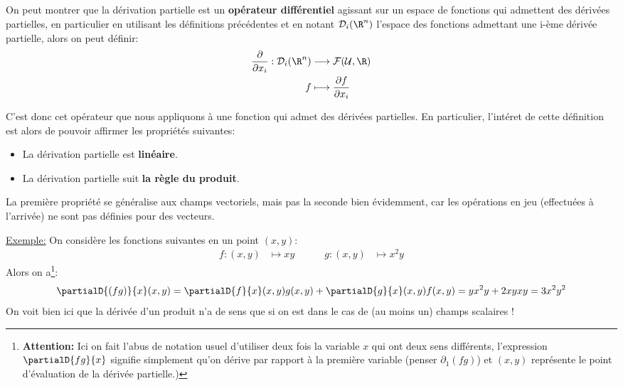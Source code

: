 \subsection*{}
On peut montrer que la dérivation partielle est un \textbf{opérateur différentiel} agissant sur un espace de fonctions qui admettent des dérivées partielles, en particulier en utilisant les définitions précédentes et en notant \(\mathcal{D}_i(\R^n)\) l'espace des fonctions admettant une i-ème dérivée partielle, alors on peut définir:
\[
   \begin{aligned}
      \frac{\partial}{\partial x_i} : \mathcal{D}_i(\R^n) &\longrightarrow \mathcal{F}(\mathcal{U}, \R)\\
      f &\longmapsto \frac{\partial f}{\partial x_i}
   \end{aligned}
\]

C'est donc cet opérateur que nous appliquons à une fonction qui admet des dérivées partielles. En particulier, l'intéret de cette définition est alors de pouvoir affirmer les propriétés suivantes:
\begin{itemize}
   \item La dérivation partielle est \textbf{linéaire}.
   \item La dérivation partielle suit \textbf{la règle du produit}.
\end{itemize}
La première propriété se généralise aux champs vectoriels, mais pas la seconde bien évidemment, car les opérations en jeu (effectuées à l'arrivée) ne sont pas définies pour des vecteurs.\<

\underline{Exemple:} On considère les fonctions suivantes en un point \((x, y)\):
\[
   \begin{aligned}
      f : (x, y) &\longmapsto xy \quad\quad\quad g : (x, y) &\longmapsto x^2y
   \end{aligned}
\]
Alors on a\footnote[1]{\textbf{Attention:} Ici on fait l'abus de notation usuel d'utiliser deux fois la variable \(x\) qui ont deux sens différents, l'expression \(\partialD{fg}{x}\) signifie simplement qu'on dérive par rapport à la première variable (penser \(\partial_1(fg)\)) et \((x, y)\) représente le point d'évaluation de la dérivée partielle.)}:
\[
   \partialD{(fg)}{x}(x, y) = \partialD{f}{x}(x, y)g(x, y) + \partialD{g}{x}(x, y)f(x, y) = yx^2y + 2xyxy = 3x^2y^2
\]
On voit bien ici que la dérivée d'un produit n'a de sens que si on est dans le cas de (au moins un) champs scalaires !
